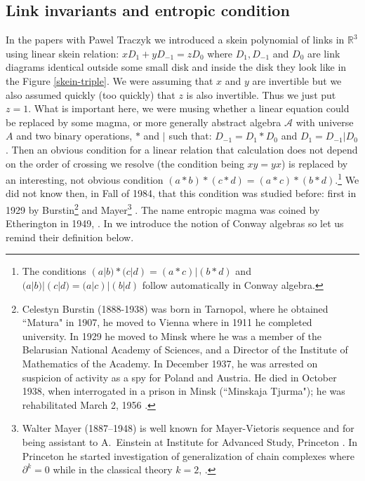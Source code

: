 \documentclass[12pt]{amsart}
\begin{document}
\subsection{Link invariants and entropic condition}\label{Entropic}
In the papers with Pawel Traczyk \cite{PT1,PT2} we introduced a skein polynomial of links in $\mathbb R^3$ using linear skein relation:
$xD_1 +yD_{-1} =z D_0$ where $D_1,D_{-1} $ and $D_0$ are link diagrams identical 
outside some small disk and inside the disk they look like in the Figure \ref{skein-triple}. We were assuming that $x$ and $y$ are invertible but we also assumed  quickly (too quickly) that $z$ is also invertible. Thus we just put $z=1$. 
What is important here, we were musing whether a linear equation could be replaced 
by some magma, or more generally abstract algebra $\mathcal A$ with universe $A$ and two  binary operations, $*$ and $|$  such that:
$D_{-1}=D_1*D_0$ and $D_1=D_{-1}|D_0$.
Then an obvious condition for a linear relation that calculation does not depend on the order of crossing we resolve (the condition being $xy=yx$) is replaced by an interesting, not obvious condition $(a*b)*(c*d)=(a*c)*(b*d)$.\footnote{The conditions $(a|b)*(c|d)=(a*c)|(b*d)$ and $(a|b)|(c|d)=(a|c)|(b|d)$ follow automatically in Conway algebra.} We did not know then, in Fall of 1984, that this condition was studied before: first in 1929 by Burstin\footnote{Celestyn Burstin (1888-1938)
was born in Tarnopol, where he obtained ``Matura" in 1907, he moved to Vienna where in 1911 he completed university.
In 1929 he moved to Minsk where he was a member of the Belarusian National Academy of Sciences,
and a Director of the Institute of Mathematics of the Academy. In December 1937,
he was arrested on suspicion of activity as a
spy for Poland and Austria. He died in October 1938, when interrogated in a prison in Minsk (``Minskaja Tjurma");
he was rehabilitated March 2, 1956 \cite{Bur-1,Bur-M,Mal,Mio}.} and Mayer\footnote{Walter Mayer (1887--1948) is well known for Mayer-Vietoris sequence and for being
assistant to A.~Einstein at Institute for Advanced Study, Princeton \cite{Isa}. In Princeton he started investigation of generalization of chain complexes where $\partial^k=0$ while in the classical theory $k=2$, \cite{Mayer}.}  \cite{BuMa}. The name entropic magma was coined by Etherington in 1949, \cite{Eth}.
In \cite{PT1,PT2} we introduce the notion of Conway algebras so let us remind their definition below.
\end{document}
